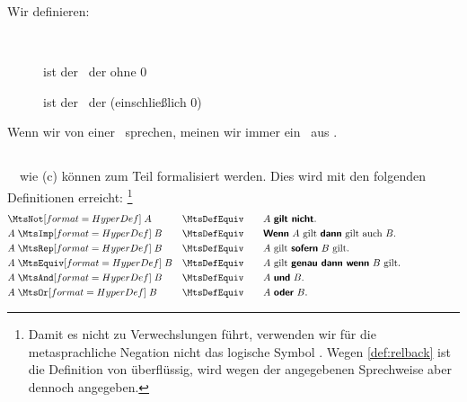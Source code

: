 Wir definieren:
\begin{description}
	\item[ \MtsUniversum] 
	\item[  \MtsAussagen]  
	\item[    \MtsObjekte]   
	\item[~] ist der \Bereich\ der   ohne           $0$
	\item[] ist der \Bereich\ der  (einschließlich $0$)
\end{description}
Wenn wir von einer \natuerlichenZahl\ sprechen, meinen wir immer ein \Element\ aus \MtsINo.


\subsection[Metaoperationen]{\Metaoperationen}%
\label  {sub:Metaoperationen}

\Zerlegbare\ \Aussagen\ wie (c) können zum Teil formalisiert werden.
Dies wird mit den folgenden Definitionen erreicht:%
\footnote{%
	Damit es nicht zu Verwechslungen führt, verwenden wir für die metasprachliche Negation nicht das logische Symbol \chrqt{\OjkNot}.
	Wegen \eqref{def:relback}  ist die Definition von \chrqt{\MtsRep} überflüssig, wird wegen der angegebenen Sprechweise aber dennoch angegeben.
}
\begin{align}
	&    \defSymUna{\MtsNot}   A & \MtsDefEquiv \qquad &
	\text{$A$ \DefFt{gilt nicht}.}
	\\
	& A \defSymBin{\MtsImp}   B & \MtsDefEquiv \qquad &
	\text{\DefFt{Wenn} $A$ gilt \DefFt{dann} gilt auch $B$.}
	\\
	& A \defSymBin{\MtsRep}   B & \MtsDefEquiv \qquad &
	\text{$A$ gilt \DefFt{sofern} $B$ gilt.}
	\\
	& A \defSymBin{\MtsEquiv} B & \MtsDefEquiv \qquad &
	\text{$A$ gilt \DefFt{genau dann wenn} $B$ gilt.}
	\\
	& A \defSymBin{\MtsAnd}   B & \MtsDefEquiv \qquad &
	\text{$A$ \DefFt{und}  $B$.}
	\\
	& A \defSymBin{\MtsOr}    B & \MtsDefEquiv \qquad &
	\text{$A$ \DefFt{oder} $B$.}
	\formulatoleft
\end{align}

